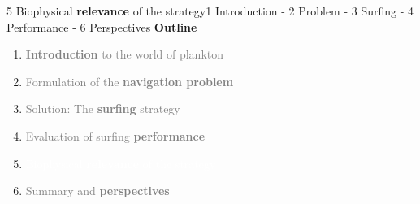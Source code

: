 
\begin{frame}{5 Biophysical \textbf{relevance} of the strategy}{1 Introduction - 2 Problem - 3 Surfing - 4 Performance - 6 Perspectives}
	\centering
	\vspace{15pt}
	\textbf{\Large Outline}

	\vspace{15pt}

	\large
	\begin{enumerate}
		\setlength\itemsep{10pt}
		\item \textcolor{gray}{\textbf{Introduction} to the world of plankton}
		\item \textcolor{gray}{Formulation of the \textbf{navigation problem}}
		\item \textcolor{gray}{Solution: The \textbf{surfing} strategy}
		\item \textcolor{gray}{Evaluation of surfing \textbf{performance}}
		\item \textcolor{white}{Biophysical \textbf{relevance} of the strategy}
		\item \textcolor{gray}{Summary and \textbf{perspectives}}
	\end{enumerate}

\end{frame}


